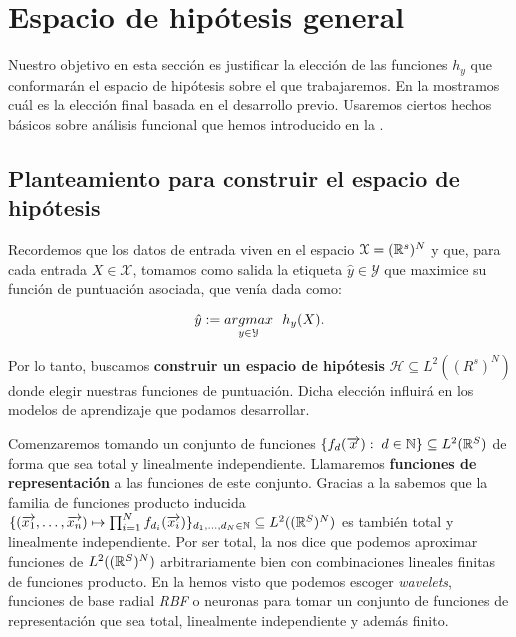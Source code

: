 \section{Espacio de hipótesis general} \label{sec:espacio_hipotesis_general}

Nuestro objetivo en esta sección es justificar la elección de las funciones $h_y$ que conformarán el espacio de hipótesis sobre el que trabajaremos. En la  mostramos cuál es la elección final basada en el desarrollo previo. Usaremos ciertos hechos básicos sobre análisis funcional que hemos introducido en la .

\subsection{Planteamiento para construir el espacio de hipótesis} \label{sec:justificacion_func_repr}

Recordemos que los datos de entrada viven en el espacio $\mathcal{X} = (\mathbb{R}^s)^N$ y que, para cada entrada $X \in \mathcal{X}$, tomamos como salida la etiqueta $\hat{y} \in \mathcal{Y}$ que maximice su función de puntuación asociada, que venía dada como:

\begin{equation}
	\hat{y} := \underset{y \in \mathcal{Y}}{argmax} \ \  h_y(X).
\end{equation}

Por lo tanto, buscamos \textbf{construir un espacio de hipótesis} $\mathcal{H} \subseteq L^2((R^s)^N)$ donde elegir nuestras funciones de puntuación. Dicha elección influirá en los modelos de aprendizaje que podamos desarrollar.

Comenzaremos tomando un conjunto de funciones $\{ f_d(\overrightarrow{x}): \; d \in \mathbb{N} \} \subseteq L^2(\mathbb{R}^S)$ de forma que sea total y linealmente independiente. Llamaremos \textbf{funciones de representación} a las funciones de este conjunto. Gracias a la  sabemos que la familia de funciones producto inducida $\{ (\overrightarrow{x_1}, \ldots, \overrightarrow{x_n}) \mapsto \prod_{i = 1}^N f_{d_i}(\overrightarrow{x_i})  \}_{d_1, \ldots, d_N \in \mathbb{N}} \subseteq L^2((\mathbb{R}^S)^N)$ es también total y linealmente independiente. Por ser total, la  nos dice que podemos aproximar funciones de $L^2((\mathbb{R}^S)^N)$ arbitrariamente bien con combinaciones lineales finitas de funciones producto. En la  hemos visto que podemos escoger \textit{wavelets}, funciones de base radial \textit{RBF} o neuronas para tomar un conjunto de funciones de representación que sea total, linealmente independiente y además finito.

